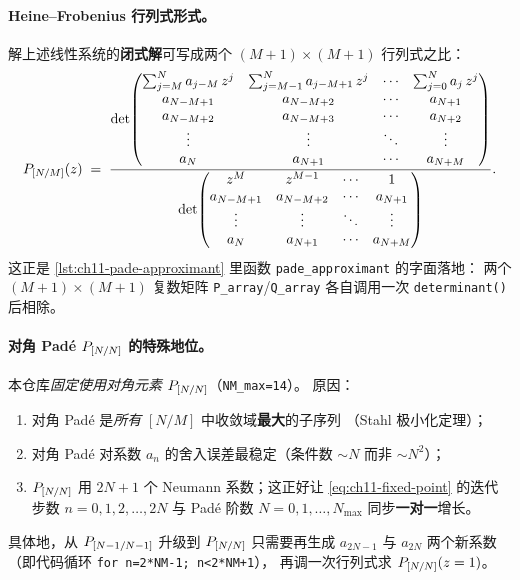\paragraph{Heine--Frobenius 行列式形式。}
解上述线性系统的\textbf{闭式解}可写成两个 \((M+1)\times(M+1)\) 行列式之比：
\begin{equation}
\label{eq:ch11-pade-det}
P_{[N/M]}(z)
\;=\;
\frac{
\det\!\begin{pmatrix}
\sum_{j=M}^{N} a_{j-M}\,z^j & \sum_{j=M-1}^{N} a_{j-M+1}\,z^j & \cdots & \sum_{j=0}^{N} a_{j}\,z^j \\
a_{N-M+1} & a_{N-M+2} & \cdots & a_{N+1} \\
a_{N-M+2} & a_{N-M+3} & \cdots & a_{N+2} \\
\vdots & \vdots & \ddots & \vdots \\
a_{N} & a_{N+1} & \cdots & a_{N+M}
\end{pmatrix}
}{
\det\!\begin{pmatrix}
z^M & z^{M-1} & \cdots & 1 \\
a_{N-M+1} & a_{N-M+2} & \cdots & a_{N+1} \\
\vdots & \vdots & \ddots & \vdots \\
a_{N} & a_{N+1} & \cdots & a_{N+M}
\end{pmatrix}
}.
\end{equation}
这正是 \cref{lst:ch11-pade-approximant} 里函数 \texttt{pade\_approximant} 的字面落地：
两个 \((M+1)\times(M+1)\) 复数矩阵 \texttt{P\_array}/\texttt{Q\_array} 各自调用一次
\texttt{determinant()} 后相除。

\paragraph{对角 Padé \texorpdfstring{$P_{[N/N]}$}{[N/N]} 的特殊地位。}
本仓库\emph{固定使用对角元素 \(P_{[N/N]}\)}（\texttt{NM\_max=14}）。
原因：
\begin{enumerate}
  \item 对角 Padé 是\emph{所有} \([N/M]\) 中收敛域\textbf{最大}的子序列
        （Stahl 极小化定理）；
  \item 对角 Padé 对系数 \(a_n\) 的舍入误差最稳定（条件数 \(\sim N\) 而非 \(\sim N^2\)）；
  \item \(P_{[N/N]}\) 用 \(2N+1\) 个 Neumann 系数；这正好让
        \cref{eq:ch11-fixed-point} 的迭代步数 \(n=0, 1, 2, \ldots, 2N\)
        与 Padé 阶数 \(N=0, 1, \ldots, N_{\max}\) 同步\textbf{一对一}增长。
\end{enumerate}
具体地，从 \(P_{[N-1/N-1]}\) 升级到 \(P_{[N/N]}\) 只需要再生成
\(a_{2N-1}\) 与 \(a_{2N}\) 两个新系数（即代码循环 \texttt{for n=2*NM-1; n<2*NM+1}），
再调一次行列式求 \(P_{[N/N]}(z=1)\)。

